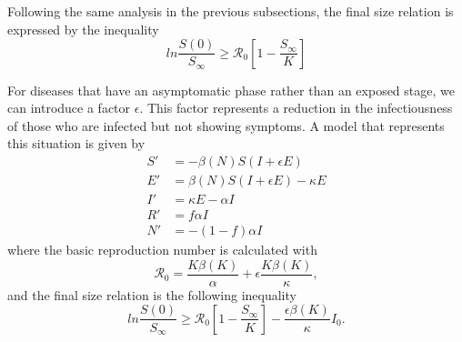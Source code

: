 Following the same analysis in the previous subsections, the final size relation is expressed by the inequality \cite{brauerCompartmentalModelsEpidemiology2008}
\begin{equation*}
    ln \frac{S(0)}{S_\infty} \geq \mathcal{R}_0 \left[ 1 - \frac{S_\infty}{K} \right]
\end{equation*}

For diseases that have an asymptomatic phase rather than an exposed stage, we can introduce a factor $\epsilon$.
This factor represents a reduction in the infectiousness of those who are infected but not showing symptoms.
A model that represents this situation is given by \cite{brauerCompartmentalModelsEpidemiology2008}
\begin{align*}
    S' &= - \beta(N)S(I + \epsilon E) \\
    E' &= \beta(N)S(I + \epsilon E) - \kappa E \\
    I' &= \kappa E - \alpha I \\
    R' &= f \alpha I \\
    N' &= - (1 - f) \alpha I
\end{align*}
where the basic reproduction number is calculated with
\begin{equation*}
    \mathcal{R}_0 = \frac{K\beta(K)}{\alpha} + \epsilon\frac{K\beta(K)}{\kappa},
\end{equation*}
and the final size relation is the following inequality
\begin{equation*}
    ln \frac{S(0)}{S_\infty} \geq \mathcal{R}_0 \left[ 1 - \frac{S_\infty}{K} \right] - \frac{\epsilon\beta(K)}{\kappa}I_0.
\end{equation*}